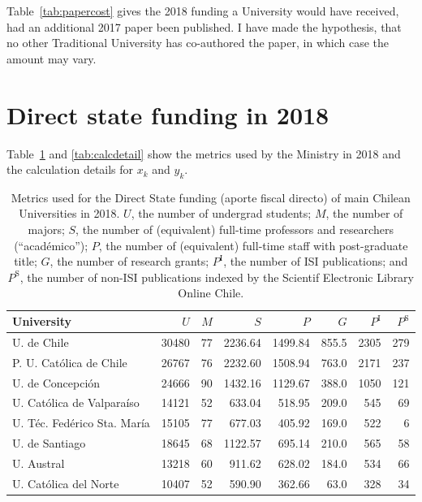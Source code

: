 \documentclass[twocolumn]{article}
\def\npup{\ensuremath{U}}
\def\nmaj{\ensuremath{M}}
\def\nprof{\ensuremath{S}}
\def\ngrad{\ensuremath{P}}
\def\ngrant{\ensuremath{G}}
\def\nisi{\ensuremath{P^\text{I}}}
\def\nscielo{\ensuremath{P^\text{S}}}
\begin{document}
Table~\ref{tab:papercost} gives the 2018 funding a University would have received,
had an additional 2017 paper been published.  I have made the hypothesis, that
no other Traditional University has co-authored the paper, in which case the
amount may vary. 

\appendix
\section{Direct state funding in 2018}
\label{sec:2018}

Table~\ref{tab:metrics} and \ref{tab:calcdetail} show the metrics used by the
Ministry in 2018 and the calculation details for $x_k$ and $y_k$. 

\begin{table}
\caption{Metrics used for the Direct State funding (aporte fiscal directo) of
main Chilean Universities in 2018. \npup{}, the number of
undergrad students; \nmaj{}, the number of majors; \nprof{}, the number of
(equivalent) full-time professors and researchers (``académico''); \ngrad{},
the number of (equivalent) full-time staff with post-graduate title; \ngrant{},
the number of research grants; $\nisi$, the number of ISI publications; and
$\nscielo$, the number of non-ISI publications indexed by the Scientif
Electronic Library Online Chile.}
\label{tab:metrics}
\centering\footnotesize
\begin{tabular}{l rrrrrrr}
\hline
University                 & \npup  & \nmaj &\nprof  &\ngrad &\ngrant& \nisi&\nscielo\\
\hline\hline
U. de Chile               & 30480 	& 77 &   2236.64&1499.84&855.5  &  2305&	279  \\
P. U. Católica de Chile    & 26767 	& 76 &   2232.60&1508.94&763.0  &  2171&	237  \\
U. de Concepción           & 24666 	& 90 &   1432.16&1129.67&388.0  &  1050&	121  \\
U. Católica de Valparaíso  & 14121 	& 52 &    633.04& 518.95&209.0  &   545&	 69  \\
U. Téc. Fedérico Sta. María& 15105 	& 77 &    677.03& 405.92&169.0  &   522&	  6  \\
U. de Santiago             & 18645 	& 68 &   1122.57& 695.14&210.0  &   565&	 58  \\
U. Austral                 & 13218 	& 60 &    911.62& 628.02&184.0  &   534&	 66  \\
U. Católica del Norte      & 10407 	& 52 &    590.90& 362.66& 63.0  &   328&	 34  \\

\end{tabular}
\end{table}
\end{document}
